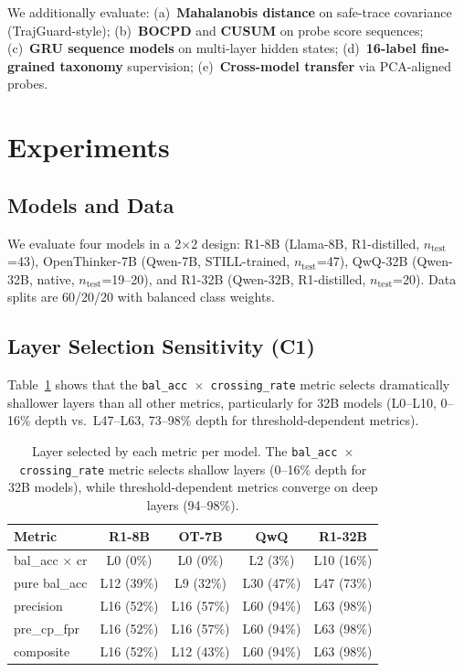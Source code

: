 \documentclass[11pt]{article}
\begin{document}
We additionally evaluate:
(a)~\textbf{Mahalanobis distance} on safe-trace covariance (TrajGuard-style);
(b)~\textbf{BOCPD} and \textbf{CUSUM} on probe score sequences;
(c)~\textbf{GRU sequence models} on multi-layer hidden states;
(d)~\textbf{16-label fine-grained taxonomy} supervision;
(e)~\textbf{Cross-model transfer} via PCA-aligned probes.

\section{Experiments}
\label{sec:experiments}

\subsection{Models and Data}
We evaluate four models in a 2$\times$2 design: R1-8B (Llama-8B, R1-distilled, $n_{\text{test}}$=43), OpenThinker-7B (Qwen-7B, STILL-trained, $n_{\text{test}}$=47), QwQ-32B (Qwen-32B, native, $n_{\text{test}}$=19--20), and R1-32B (Qwen-32B, R1-distilled, $n_{\text{test}}$=20).
Data splits are 60/20/20 with balanced class weights.

\subsection{Layer Selection Sensitivity (C1)}
\label{sec:layer_sensitivity}

Table~\ref{tab:layer_selection} shows that the \texttt{bal\_acc $\times$ crossing\_rate} metric selects dramatically shallower layers than all other metrics, particularly for 32B models (L0--L10, 0--16\% depth vs.\ L47--L63, 73--98\% depth for threshold-dependent metrics).

\begin{table}[t]
\centering
\small
\begin{tabular}{@{}lcccc@{}}
\toprule
\textbf{Metric} & \textbf{R1-8B} & \textbf{OT-7B} & \textbf{QwQ} & \textbf{R1-32B} \\
\midrule
bal\_acc $\times$ cr & L0 (0\%) & L0 (0\%) & L2 (3\%) & L10 (16\%) \\
pure bal\_acc & L12 (39\%) & L9 (32\%) & L30 (47\%) & L47 (73\%) \\
precision & L16 (52\%) & L16 (57\%) & L60 (94\%) & L63 (98\%) \\
pre\_cp\_fpr & L16 (52\%) & L16 (57\%) & L60 (94\%) & L63 (98\%) \\
composite & L16 (52\%) & L12 (43\%) & L60 (94\%) & L63 (98\%) \\
\bottomrule
\end{tabular}
\caption{Layer selected by each metric per model. The \texttt{bal\_acc $\times$ crossing\_rate} metric selects shallow layers (0--16\% depth for 32B models), while threshold-dependent metrics converge on deep layers (94--98\%).}
\label{tab:layer_selection}
\end{table}
\end{document}
